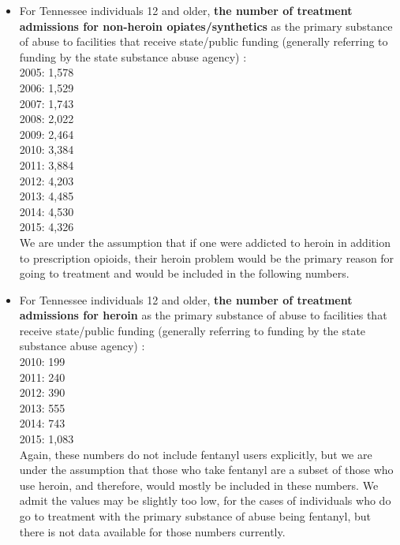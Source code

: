 \documentclass[12pt]{article}
\begin{document}
\begin{itemize}
\item For Tennessee individuals 12 and older, \textbf{the number of treatment admissions for non-heroin opiates/synthetics} as the primary substance of abuse to facilities that receive state/public funding (generally referring to funding by the state substance abuse agency) \cite{TEDS2015_SAMSHA_admissions}: \\
2005: 1,578 \\
2006: 1,529 \\
2007: 1,743 \\
2008: 2,022 \\
2009: 2,464 \\
2010: 3,384 \\
2011: 3,884 \\
2012: 4,203 \\
2013: 4,485 \\
2014: 4,530 \\
2015: 4,326 \\

We are under the assumption that if one were addicted to heroin in addition to prescription opioids, their heroin problem would be the primary reason for going to treatment and would be included in the following numbers. 


\item For Tennessee individuals 12 and older, \textbf{the number of treatment admissions for heroin} as the primary substance of abuse to facilities that receive state/public funding (generally referring to funding by the state substance abuse agency) \cite{TEDS2015_SAMSHA_admissions}: \\
2010: 199\\
2011: 240 \\
2012: 390 \\
2013: 555 \\
2014: 743 \\
2015: 1,083 \\


Again, these numbers do not include fentanyl users explicitly, but we are under the assumption that those who take fentanyl are a subset of those who use heroin, and therefore, would mostly be included in these numbers. We admit the values may be slightly too low, for the cases of individuals who do go to treatment with the primary substance of abuse being fentanyl, but there is not data available for those numbers currently. 



\end{itemize}
\end{document}
